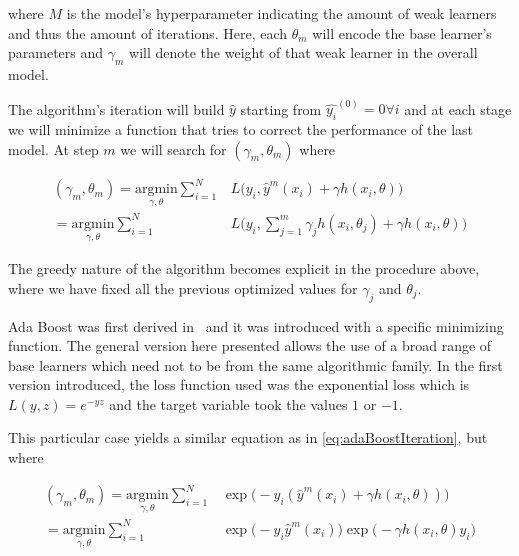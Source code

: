 where $M$ is the model's hyperparameter indicating the amount of weak learners and thus the amount of iterations.
Here, each $\theta_m$ will encode the base learner's parameters and $\gamma_m$ will denote the weight of that weak learner in the overall model.

The algorithm's iteration will build $\hat{y}$ starting from $\hat{y_i}^{(0)}= 0 \forall i$ and at each stage we will minimize a function that tries to correct the performance of the last model.
At step $m$ we will search for $(\gamma_{m}, \theta_{m})$ where

\begin{equation}\label{eq:adaBoostIteration}
\begin{split}
(\gamma_{m}, \theta_{m}) = \underset{\gamma, \theta}{\mathrm{argmin}} \sum_{i=1}^{N} & L\big( y_i,  \hat{y}^{m}(x_i) + \gamma h(x_i,\theta) \big) \\
= \underset{\gamma, \theta}{\mathrm{argmin}} \sum_{i=1}^{N} & L\big( y_i,  \sum_{j=1}^{m} \gamma_j h(x_i,\theta_j) + \gamma h(x_i,\theta) \big)
\end{split}
\end{equation}

The greedy nature of the algorithm becomes explicit in the procedure above, where we have fixed all the previous optimized values for $\gamma_j$ and $\theta_j$.

Ada Boost was first derived in~\citep{schapire-adaBoost} and it was introduced with a specific minimizing function.
The general version here presented allows the use of a broad range of base learners which need not to be from the same algorithmic family.
In the first version introduced, the loss function used was the exponential loss which is $L(y,z) = e^{-yz}$ and the target variable took the values $1$ or $-1$.

This particular case yields a similar equation as in \cref{eq:adaBoostIteration}, but where

\begin{equation}\label{eq:sadaBoostExponentialIteration}
\begin{split}
(\gamma_{m}, \theta_{m}) = \underset{\gamma, \theta}{\mathrm{argmin}} \sum_{i=1}^{N} & \exp\big( -y_i (\hat{y}^{m}(x_i) + \gamma h(x_i,\theta) )\big) \\
= \underset{\gamma, \theta}{\mathrm{argmin}} \sum_{i=1}^{N} &
\exp\big( -y_i \hat{y}^{m}(x_i)\big) \exp\big(- \gamma h(x_i,\theta)y_i \big)
\end{split}
\end{equation}


